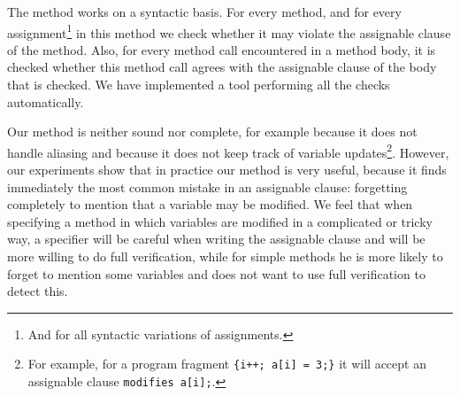 \documentclass[a4paper]{llncs}
\newcommand{\escj}{\textsc{Esc/Java}}
\newcommand{\jass}{\textsc{Jass}}
\begin{document}
The method works on a syntactic basis. For every method, and for every
assignment\footnote{And for all syntactic variations of assignments.}
in this method we check whether it may violate the assignable clause
of the method. Also, for every method call encountered in a method
body, it is checked whether this method call agrees with the
assignable clause of the body that is checked. We have implemented a
tool performing all the checks automatically.

Our method is neither sound nor complete, for example because it does
not handle aliasing and because it does not keep track of variable
updates\footnote{For example, for a program fragment \texttt{\{i++;
a[i] = 3;\}} it will accept an assignable clause \texttt{modifies
a[i];}.}. However, our experiments show that in practice our method is
very useful, because it finds immediately the most common mistake in
an assignable clause: forgetting completely to mention that a variable
may be modified.  We feel that when specifying a method in which
variables are modified in a complicated or tricky way, a specifier
will be careful when writing the assignable clause and will be more
willing to do full verification, while for simple methods he is more
likely to forget to mention some variables and does not want to
use full verification to detect this.






\end{document}

